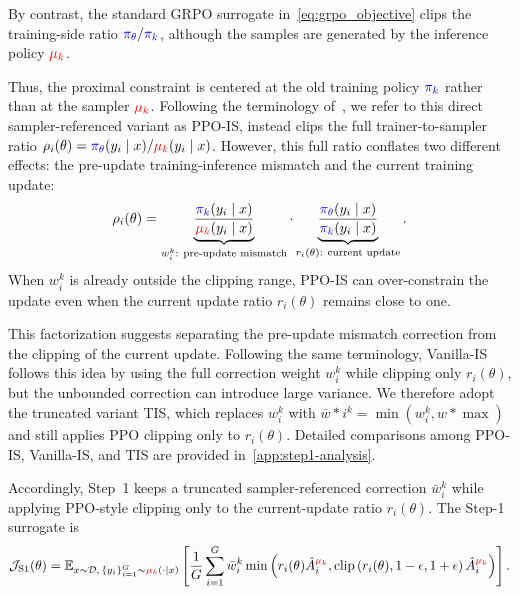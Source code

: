 By contrast, the standard GRPO surrogate in~\autoref{eq:grpo_objective} clips the training-side ratio 
$\textcolor{blue}{\pi_\theta}/\textcolor{blue}{\pi_k}$, 
although the samples are generated by the inference policy $\textcolor{red}{\mu_k}$. 

Thus, the proximal constraint is centered at the old training policy $\textcolor{blue}{\pi_k}$ rather than at the sampler $\textcolor{red}{\mu_k}$. 
Following the terminology of~\citet{mismatch1}, we refer to this direct sampler-referenced variant as PPO-IS, instead clips the full trainer-to-sampler ratio 
$\rho_i(\theta)=\textcolor{blue}{\pi_\theta}(y_i\mid x)/\textcolor{red}{\mu_k}(y_i\mid x)$. 
However, this full ratio conflates two different effects: the pre-update training-inference mismatch and the current training update:
\begin{equation}
    \rho_i(\theta)
    =
    \underbrace{
        \frac{
            \textcolor{blue}{\pi_k}(y_i\mid x)
        }{
            \textcolor{red}{\mu_k}(y_i\mid x)
        }
    }_{w_i^k:\ \text{pre-update mismatch}}
    \cdot
    \underbrace{
        \frac{
            \textcolor{blue}{\pi_\theta}(y_i\mid x)
        }{
            \textcolor{blue}{\pi_k}(y_i\mid x)
        }
    }_{r_i(\theta):\ \text{current update}} .
    \label{eq:ratio_factorization}
\end{equation}
When $w_i^k$ is already outside the clipping range, PPO-IS can over-constrain the update even when the current update ratio $r_i(\theta)$ remains close to one. 

This factorization suggests separating the pre-update mismatch correction from the clipping of the current update. Following the same terminology, Vanilla-IS follows this idea by using the full correction weight $w_i^k$ while clipping only $r_i(\theta)$, but the unbounded correction can introduce large variance. We therefore adopt the truncated variant TIS, which replaces $w_i^k$ with $\bar{w}*i^k=\min(w_i^k,w*{\max})$ and still applies PPO clipping only to $r_i(\theta)$. Detailed comparisons among PPO-IS, Vanilla-IS, and TIS are provided in~\autoref{app:step1-analysis}.

Accordingly, Step~1 keeps a truncated sampler-referenced correction $\bar{w}_i^k$ while applying PPO-style clipping only to the current-update ratio $r_i(\theta)$. 
The Step-1 surrogate is
\begin{equation}
\begin{aligned}
    \mathcal{J}_{\mathrm{S1}}(\theta)
    =
    \mathbb{E}_{x\sim\mathcal{D},\, \{y_i\}_{i=1}^{G}\sim \textcolor{red}{\mu_k}(\cdot\mid x)}
    \left[
        \frac{1}{G}
        \sum_{i=1}^{G}
        \bar{w}_i^k
        \min
        \left(
            r_i(\theta)\hat{A}^{\textcolor{red}{\mu_k}}_i,
            \operatorname{clip}
            \left(
                r_i(\theta),
                1-\epsilon,
                1+\epsilon
            \right)
            \hat{A}^{\textcolor{red}{\mu_k}}_i
        \right)
    \right].
\end{aligned}
\label{eq:step1_surrogate}
\end{equation}


